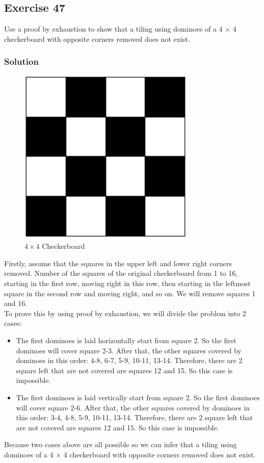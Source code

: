 \documentclass{article}
\begin{document}
\subsection*{Exercise 47}
Use a proof by exhaustion to show that a tiling using
dominoes of a 4 $\times$ 4 checkerboard with opposite corners
removed does not exist.
\subsubsection*{Solution}
\begin{figure}
    \begin{center}
        \includegraphics{4x4CheckerBoard.jpeg}
        \caption{\(4 \times 4\) Checkerboard}
    \end{center}
\end{figure}
Firstly, assume that the squares in the upper left and lower right corners
removed. Number of the squares of the original checkerboard from 1 to 16,
starting in the first row, moving right in this row, then starting in the 
leftmost square in the second row and moving right, and so on. We will remove
squares 1 and 16.\\

To prove this by using proof by exhaustion, we will divide the problem into
2 cases:
\begin{itemize}
    \item The first dominoes is laid horizontally start from square 2. So the first dominoes
    will cover square 2-3. After that, the other squares covered by dominoes
    in this order: 4-8, 6-7, 5-9, 10-11, 13-14. Therefore, there are 2 square
    left that are not covered are squares 12 and 15. So this case is impossible.
    \item The first dominoes is laid vertically start from square 2. So the first dominoes
    will cover square 2-6. After that, the other squares covered by dominoes
    in this order: 3-4, 4-8, 5-9, 10-11, 13-14. Therefore, there are 2 square
    left that are not covered are squares 12 and 15. So this case is impossible.
\end{itemize}
Because two cases above are all possible so we can infer that a tiling using dominoes of a 4 × 4
checkerboard with opposite corners removed does not exist.
\end{document}
